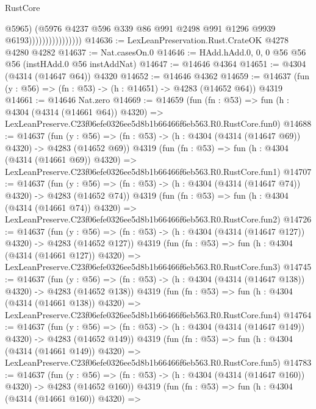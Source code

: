\begin{lexlean}{RustCore}
\begin{coremodule}
                                    @5965)
                                  (@5976
                                    @4237
                                    @596
                                    @339
                                    @86
                                    @991
                                    @2498
                                    @991
                                    @1296
                                    @9939
                                    @6193))))))))))))))))
@14636 := LexLeanPreservation.Rust.CrateOK @4278 @4280 @4282
@14637 := Nat.casesOn.{0}
@14646 := HAdd.hAdd.{0, 0, 0} @56 @56 @56 (instHAdd.{0} @56 instAddNat)
@14647 := @14646 @4364
@14651 := @4304 (@4314 (@14647 @64)) @4320
@14652 := @14646 @4362
@14659 := @14637 (fun (y : @56) => (fn : @53) -> (h : @14651) -> @4283 (@14652 @64)) @4319
@14661 := @14646 Nat.zero
@14669 := @14659
    (fun (fn : @53) =>
    fun (h : @4304 (@4314 (@14661 @64)) @4320) =>
    LexLeanPreserve.C23f06efe0326ee5d8b1b66466f6eb563.R0.RustCore.fun0)
@14688 := @14637
    (fun (y : @56) => (fn : @53) -> (h : @4304 (@4314 (@14647 @69)) @4320) -> @4283 (@14652 @69))
    @4319
    (fun (fn : @53) =>
    fun (h : @4304 (@4314 (@14661 @69)) @4320) =>
    LexLeanPreserve.C23f06efe0326ee5d8b1b66466f6eb563.R0.RustCore.fun1)
@14707 := @14637
    (fun (y : @56) => (fn : @53) -> (h : @4304 (@4314 (@14647 @74)) @4320) -> @4283 (@14652 @74))
    @4319
    (fun (fn : @53) =>
    fun (h : @4304 (@4314 (@14661 @74)) @4320) =>
    LexLeanPreserve.C23f06efe0326ee5d8b1b66466f6eb563.R0.RustCore.fun2)
@14726 := @14637
    (fun (y : @56) => (fn : @53) -> (h : @4304 (@4314 (@14647 @127)) @4320) -> @4283 (@14652 @127))
    @4319
    (fun (fn : @53) =>
    fun (h : @4304 (@4314 (@14661 @127)) @4320) =>
    LexLeanPreserve.C23f06efe0326ee5d8b1b66466f6eb563.R0.RustCore.fun3)
@14745 := @14637
    (fun (y : @56) => (fn : @53) -> (h : @4304 (@4314 (@14647 @138)) @4320) -> @4283 (@14652 @138))
    @4319
    (fun (fn : @53) =>
    fun (h : @4304 (@4314 (@14661 @138)) @4320) =>
    LexLeanPreserve.C23f06efe0326ee5d8b1b66466f6eb563.R0.RustCore.fun4)
@14764 := @14637
    (fun (y : @56) => (fn : @53) -> (h : @4304 (@4314 (@14647 @149)) @4320) -> @4283 (@14652 @149))
    @4319
    (fun (fn : @53) =>
    fun (h : @4304 (@4314 (@14661 @149)) @4320) =>
    LexLeanPreserve.C23f06efe0326ee5d8b1b66466f6eb563.R0.RustCore.fun5)
@14783 := @14637
    (fun (y : @56) => (fn : @53) -> (h : @4304 (@4314 (@14647 @160)) @4320) -> @4283 (@14652 @160))
    @4319
    (fun (fn : @53) =>
    fun (h : @4304 (@4314 (@14661 @160)) @4320) =>

\end{coremodule}
\end{lexlean}

